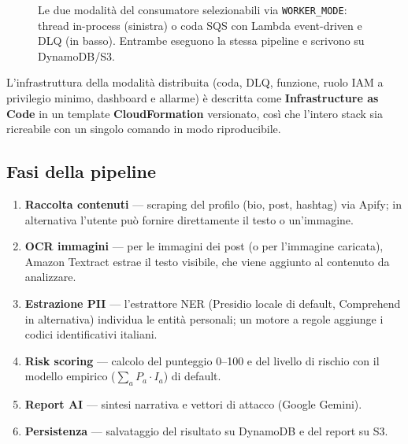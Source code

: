 \documentclass[11pt,a4paper]{article}
\begin{document}
\begin{figure}[htbp]
\centering
{}
\caption{Le due modalità del consumatore selezionabili via \texttt{WORKER\_MODE}: thread in-process (sinistra) o coda SQS con Lambda event-driven e DLQ (in basso). Entrambe eseguono la stessa pipeline e scrivono su DynamoDB/S3.}
\label{fig:worker-modes}
\end{figure}

L'infrastruttura della modalità distribuita (coda, DLQ, funzione, ruolo IAM a
privilegio minimo, dashboard e allarme) è descritta come \textbf{Infrastructure as
Code} in un template \textbf{CloudFormation} versionato, così che l'intero stack sia
ricreabile con un singolo comando in modo riproducibile.

\subsection{Fasi della pipeline}
\begin{enumerate}[nosep]
  \item \textbf{Raccolta contenuti} — scraping del profilo (bio, post, hashtag) via
        Apify; in alternativa l'utente può fornire direttamente il testo o
        un'immagine.
  \item \textbf{OCR immagini} — per le immagini dei post (o per l'immagine caricata),
        Amazon Textract estrae il testo visibile, che viene aggiunto al contenuto da
        analizzare.
  \item \textbf{Estrazione PII} — l'estrattore NER (Presidio locale di default, Comprehend
        in alternativa) individua le entità personali; un motore a regole aggiunge i codici
        identificativi italiani.
  \item \textbf{Risk scoring} — calcolo del punteggio 0--100 e del livello di rischio con
        il modello empirico ($\sum_a P_a\!\cdot\!I_a$) di default.
  \item \textbf{Report AI} — sintesi narrativa e vettori di attacco (Google Gemini).
  \item \textbf{Persistenza} — salvataggio del risultato su DynamoDB e del report su S3.
\end{enumerate}
\end{document}
